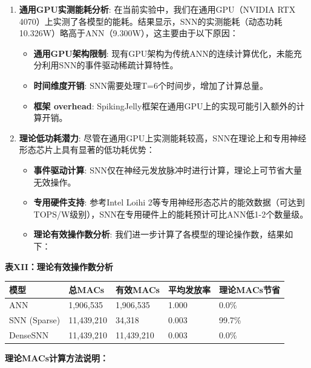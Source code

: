 \documentclass[
]{article}
\providecommand{\tightlist}{%
  \setlength{\itemsep}{0pt}\setlength{\parskip}{0pt}}
\begin{document}
\begin{enumerate}
\def\labelenumi{\arabic{enumi}.}
\tightlist
\item
  \textbf{通用GPU实测能耗分析}: 在当前实验中，我们在通用GPU（NVIDIA RTX
  4070）上实测了各模型的能耗。结果显示，SNN的实测能耗（动态功耗10.326W）略高于ANN（9.300W），这主要由于以下原因：

  \begin{itemize}
  \tightlist
  \item
    \textbf{通用GPU架构限制}:
    现有GPU架构为传统ANN的连续计算优化，未能充分利用SNN的事件驱动稀疏计算特性。
  \item
    \textbf{时间维度开销}: SNN需要处理T=6个时间步，增加了计算总量。
  \item
    \textbf{框架 overhead}:
    SpikingJelly框架在通用GPU上的实现可能引入额外的计算开销。
  \end{itemize}
\item
  \textbf{理论低功耗潜力}:
  尽管在通用GPU上实测能耗较高，SNN在理论上和专用神经形态芯片上具有显著的低功耗优势：

  \begin{itemize}
  \tightlist
  \item
    \textbf{事件驱动计算}:
    SNN仅在神经元发放脉冲时进行计算，理论上可节省大量无效操作。
  \item
    \textbf{专用硬件支持}: 参考Intel Loihi
    2等专用神经形态芯片的能效数据（可达到TOPS/W级别），SNN在专用硬件上的能耗预计可比ANN低1-2个数量级。
  \item
    \textbf{理论有效操作数分析}:
    我们进一步计算了各模型的理论操作数，结果如下：
  \end{itemize}
\end{enumerate}

\textbf{表XII：理论有效操作数分析}

\begin{longtable}[]{@{}lllll@{}}
\toprule\noalign{}
模型 & 总MACs & 有效MACs & 平均发放率 & 理论MACs节省 \\
\midrule\noalign{}
\endhead
\bottomrule\noalign{}
\endlastfoot
ANN & 1,906,535 & 1,906,535 & 1.000 & 0.0\% \\
SNN (Sparse) & 11,439,210 & 34,318 & 0.003 & 99.7\% \\
DenseSNN & 11,439,210 & 11,439,210 & 0.003 & 0.0\% \\
\end{longtable}

\textbf{理论MACs计算方法说明：}
\end{document}
